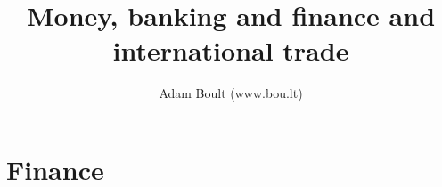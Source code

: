 \documentclass[oneside]{book}
\begin{document}
\author{Adam Boult (www.bou.lt)}
\title{Money, banking and finance and international trade}
\maketitle

\setcounter{tocdepth}{0}
\tableofcontents



\part{Finance}





\end{document}
